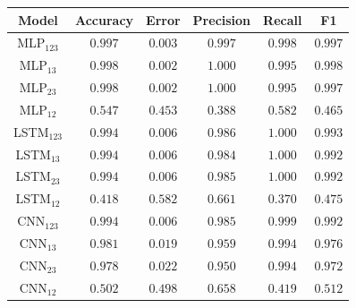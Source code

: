 \documentclass[a4paper,fleqn]{cas-sc}
\begin{document}
\hfill
\begin{minipage}{0.45\textwidth}
	\begingroup
	\begin{tiny}	
		\setlength{\tabcolsep}{3pt}
		\renewcommand{\arraystretch}{1.15}
		
		
		\begin{tabular*}{\textwidth}{@{} CCCCCC@{} }
			\toprule
			Model&Accuracy&Error&Precision&Recall&F1 \\
			\midrule
			MLP$_{123}$ & $0.997$ & $0.003$ & $0.997$ & $0.998$ & $0.997$ \\
			MLP$_{13}$ & $0.998$ & $0.002$ & $1.000$ & $0.995$ & $0.998$ \\
			MLP$_{23}$ & $0.998$ & $0.002$ & $1.000$ & $0.995$ & $0.997$ \\
			MLP$_{12}$ & $0.547$ & $0.453$ & $0.388$ & $0.582$ & $0.465$ \\
			LSTM$_{123}$ & $0.994$ & $0.006$ & $0.986$ & $1.000$ & $0.993$ \\
			LSTM$_{13}$ & $0.994$ & $0.006$ & $0.984$ & $1.000$ & $0.992$ \\
			LSTM$_{23}$ & $0.994$ & $0.006$ & $0.985$ & $1.000$ & $0.992$ \\
			LSTM$_{12}$ & $0.418$ & $0.582$ & $0.661$ & $0.370$ & $0.475$ \\
			CNN$_{123}$ & $0.994$ & $0.006$ & $0.985$ & $0.999$ & $0.992$ \\
			CNN$_{13}$ & $0.981$ & $0.019$ & $0.959$ & $0.994$ & $0.976$ \\
			CNN$_{23}$ & $0.978$ & $0.022$ & $0.950$ & $0.994$ & $0.972$ \\
			CNN$_{12}$ & $0.502$ & $0.498$ & $0.658$ & $0.419$ & $0.512$ \\    		
			\bottomrule
		\end{tabular*}
		\vspace{-0.3cm}
		\label{tab:metricas_10Mbps_teste}
	\end{tiny}
	\endgroup
\end{minipage}
\hfill
\end{document}
